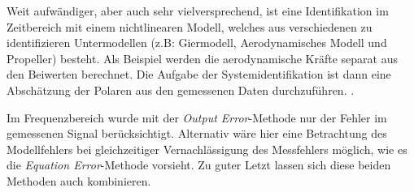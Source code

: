 Weit aufwändiger, aber auch sehr vielversprechend, ist eine Identifikation im Zeitbereich mit einem nichtlinearen 
Modell, welches aus verschiedenen zu identifizieren Untermodellen (z.B: Giermodell, Aerodynamisches Modell und Propeller) besteht. Als Beispiel werden die aerodynamische Kräfte separat aus den Beiwerten berechnet. Die Aufgabe der Systemidentifikation ist dann eine Abschätzung der Polaren aus den gemessenen Daten durchzuführen. .

Im Frequenzbereich wurde mit der \textit{Output Error}-Methode nur der Fehler im gemessenen Signal berücksichtigt. Alternativ 
wäre hier eine Betrachtung des Modellfehlers bei gleichzeitiger Vernachlässigung des Messfehlers möglich, wie es die 
\textit{Equation Error}-Methode vorsieht. Zu guter Letzt lassen sich diese beiden Methoden auch kombinieren.


